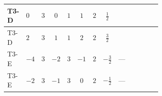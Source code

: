 \documentclass[8pt]{article}
\begin{document}
\begin{landscape}
\begin{longtable}{@{}llcccccc >{\raggedright\arraybackslash}p{0.21\linewidth} >{\raggedright\arraybackslash}p{0.21\linewidth} >{\raggedright\arraybackslash}p{0.21\linewidth}@{}}
T3-D & $0$ & $3$ & $0$ & $1$ & $1$ & $2$ & $\frac{1}{2}$ & \scriptsize\adjustbox{max width=\linewidth}{$\begin{gathered} \frac{1}{4} (3 \left(\left({y_1}\right)^{T}\,\left({y_1}\right)^{*}\,{M_F}\right)_{ij}+2 \left({M_F}\,\left({y_2}\right)^{\dagger}\,{y_2}\right)_{ij})\end{gathered}$} & \scriptsize\adjustbox{max width=\linewidth}{$\begin{gathered} -\frac{9}{2} {g_2}^2 \left({M_F}\right)_{ij}\end{gathered}$} & \scriptsize\adjustbox{max width=\linewidth}{$\begin{gathered} -\frac{3}{2} {g_1}^2 \left({M_F}\right)_{ij}\end{gathered}$} \\
\midrule
T3-D & $2$ & $3$ & $1$ & $1$ & $2$ & $2$ & $\frac{3}{2}$ & \scriptsize\adjustbox{max width=\linewidth}{$\begin{gathered} \frac{1}{4} (3 \left(\left({y_1}\right)^{T}\,\left({y_1}\right)^{*}\,{M_F}\right)_{ij}+2 \left({M_F}\,\left({y_2}\right)^{\dagger}\,{y_2}\right)_{ij})\end{gathered}$} & \scriptsize\adjustbox{max width=\linewidth}{$\begin{gathered} -\frac{9}{2} {g_2}^2 \left({M_F}\right)_{ij}\end{gathered}$} & \scriptsize\adjustbox{max width=\linewidth}{$\begin{gathered} -\frac{27}{2} {g_1}^2 \left({M_F}\right)_{ij}\end{gathered}$} \\
\midrule
T3-E & $-4$ & $3$ & $-2$ & $3$ & $-1$ & $2$ & $-\frac{3}{2}$ & --- & \scriptsize\adjustbox{max width=\linewidth}{$\begin{gathered} -\frac{9}{2} {g_2}^2 \left({M_F}\right)_{ij}\end{gathered}$} & \scriptsize\adjustbox{max width=\linewidth}{$\begin{gathered} -\frac{27}{2} {g_1}^2 \left({M_F}\right)_{ij}\end{gathered}$} \\
\midrule
T3-E & $-2$ & $3$ & $-1$ & $3$ & $0$ & $2$ & $-\frac{1}{2}$ & --- & \scriptsize\adjustbox{max width=\linewidth}{$\begin{gathered} -\frac{9}{2} {g_2}^2 \left({M_F}\right)_{ij}\end{gathered}$} & \scriptsize\adjustbox{max width=\linewidth}{$\begin{gathered} -\frac{3}{2} {g_1}^2 \left({M_F}\right)_{ij}\end{gathered}$} \\

\end{longtable}
\end{landscape}
\end{document}
